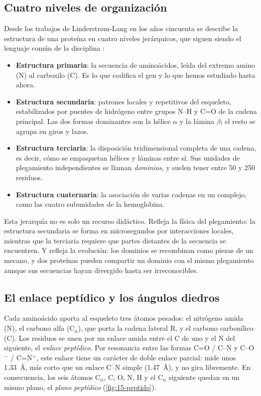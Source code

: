 \subsection{Cuatro niveles de organización}

Desde los trabajos de Linderstrøm-Lang en los años cincuenta se describe la estructura de una proteína en cuatro niveles jerárquicos, que siguen siendo el lenguaje común de la disciplina \parencite{c15-branden1999}:

\begin{itemize}
  \item \textbf{Estructura primaria}: la secuencia de aminoácidos, leída del extremo amino (N) al carboxilo (C). Es lo que codifica el gen y lo que hemos estudiado hasta ahora.
  \item \textbf{Estructura secundaria}: patrones locales y repetitivos del esqueleto, estabilizados por puentes de hidrógeno entre grupos N--H y C=O de la cadena principal. Las dos formas dominantes son la hélice $\alpha$ y la lámina $\beta$; el resto se agrupa en giros y lazos.
  \item \textbf{Estructura terciaria}: la disposición tridimensional completa de una cadena, es decir, cómo se empaquetan hélices y láminas entre sí. Sus unidades de plegamiento independientes se llaman \emph{dominios}, y suelen tener entre 50 y 250 residuos.
  \item \textbf{Estructura cuaternaria}: la asociación de varias cadenas en un complejo, como las cuatro subunidades de la hemoglobina.
\end{itemize}

Esta jerarquía no es solo un recurso didáctico. Refleja la física del plegamiento: la estructura secundaria se forma en microsegundos por interacciones locales, mientras que la terciaria requiere que partes distantes de la secuencia se encuentren. Y refleja la evolución: los dominios se recombinan como piezas de un mecano, y dos proteínas pueden compartir un dominio con el mismo plegamiento aunque sus secuencias hayan divergido hasta ser irreconocibles.

\subsection{El enlace peptídico y los ángulos diedros}

Cada aminoácido aporta al esqueleto tres átomos pesados: el nitrógeno amida (N), el carbono alfa (C$_\alpha$), que porta la cadena lateral R, y el carbono carbonílico (C). Los residuos se unen por un enlace amida entre el C de uno y el N del siguiente, el \emph{enlace peptídico}. Por resonancia entre las formas C=O / C--N y C--O$^-$ / C=N$^+$, este enlace tiene un carácter de doble enlace parcial: mide unos \SI{1,33}{\angstrom}, más corto que un enlace C--N simple (\SI{1,47}{\angstrom}), y no gira libremente. En consecuencia, los seis átomos C$_\alpha$, C, O, N, H y el C$_\alpha$ siguiente quedan en un mismo plano, el \emph{plano peptídico} (\cref{fig:15-peptido}).


